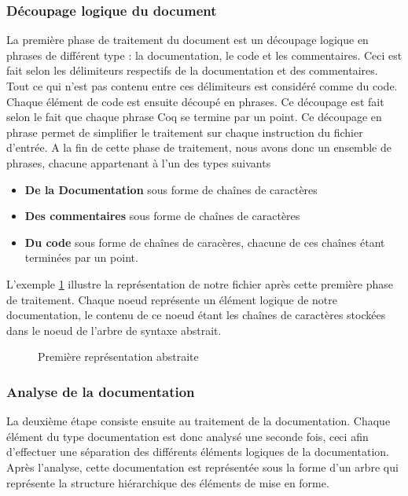 \documentclass[a4paper, 11pt]{report}
\begin{document}
    \subsubsection{Découpage logique du document}
    La première phase de traitement du document est un découpage logique
    en phrases de différent type : la documentation, le code et les
    commentaires.
    Ceci est fait selon les délimiteurs respectifs de la documentation et
    des commentaires. Tout ce qui n'est pas contenu entre ces délimiteurs
    est considéré comme du code.
    Chaque élément de code est ensuite découpé en phrases. Ce découpage est
    fait selon le fait que chaque phrase Coq se termine par un point. Ce
    découpage en phrase permet de simplifier le traitement sur chaque
    instruction du fichier d'entrée.
    A la fin de cette phase de traitement, nous avons donc un ensemble
    de phrases, chacune appartenant à l'un des types suivants
    \begin{itemize}
      \item \textbf{De la Documentation} sous forme de chaînes de caractères
      \item \textbf{Des commentaires} sous forme de chaînes de caractères
      \item \textbf{Du code} sous forme de chaînes de caracères, chacune
        de ces chaînes étant terminées par un point.
    \end{itemize}

    L'exemple \cref{ast1} illustre la représentation de notre fichier après
    cette première phase de traitement. Chaque noeud représente un élément
    logique de notre documentation, le contenu de ce noeud étant les chaînes
    de caractères stockées dans le noeud de l'arbre de syntaxe abstrait.
    \begin{figure}
      \caption{Première représentation abstraite}
      \label{ast1}
    \end{figure}
    \subsubsection{Analyse de la documentation}
    La deuxième étape consiste ensuite au traitement de la documentation.
    Chaque élément du type documentation est donc analysé une seconde fois,
    ceci afin d'effectuer une séparation des différents éléments logiques
    de la documentation. Après l'analyse, cette documentation est représentée
    sous la forme d'un arbre qui représente la structure hiérarchique des
    éléments de mise en forme.
\end{document}
